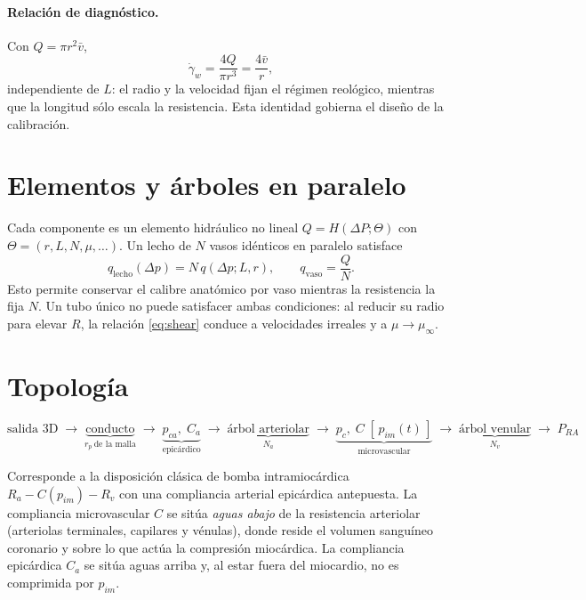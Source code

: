 \documentclass[11pt]{article}
\begin{document}
\paragraph{Relaci\'on de diagn\'ostico.} Con $Q=\pi r^2\bar v$,
\begin{equation}
  \dot\gamma_w=\frac{4Q}{\pi r^3}=\frac{4\bar v}{r},
  \label{eq:shear}
\end{equation}
independiente de $L$: el radio y la velocidad fijan el r\'egimen reol\'ogico,
mientras que la longitud s\'olo escala la resistencia. Esta identidad gobierna
el dise\~no de la calibraci\'on.

\section{Elementos y \'arboles en paralelo}

Cada componente es un elemento hidr\'aulico no lineal $Q=H(\Delta P;\Theta)$ con
$\Theta=(r,L,N,\mu,\dots)$. Un lecho de $N$ vasos id\'enticos en paralelo
satisface
\begin{equation}
  q_{\text{lecho}}(\Delta p)=N\,q(\Delta p;L,r),
  \qquad
  q_{\text{vaso}}=\frac{Q}{N} .
  \label{eq:paralelo}
\end{equation}
Esto permite conservar el calibre anat\'omico por vaso mientras la resistencia
la fija $N$. Un tubo \'unico no puede satisfacer ambas condiciones: al reducir
su radio para elevar $R$, la relaci\'on \eqref{eq:shear} conduce a velocidades
irreales y a $\mu\to\mu_\infty$.

\section{Topolog\'ia}
\label{sec:topo}

\[
\text{salida 3D}\;\rightarrow\;
\underbrace{\text{conducto}}_{r_p\ \text{de la malla}}\;\rightarrow\;
\underbrace{p_{ca},\;C_a}_{\text{epic\'ardico}}\;\rightarrow\;
\underbrace{\text{\'arbol arteriolar}}_{N_a}\;\rightarrow\;
\underbrace{p_c,\;C\;[\,p_{im}(t)\,]}_{\text{microvascular}}\;\rightarrow\;
\underbrace{\text{\'arbol venular}}_{N_v}\;\rightarrow\; P_{RA}
\]

\noindent
Corresponde a la disposici\'on cl\'asica de bomba intramioc\'ardica
$R_a-C(p_{im})-R_v$ con una compliancia arterial epic\'ardica antepuesta. La
compliancia microvascular $C$ se sit\'ua \emph{aguas abajo} de la resistencia
arteriolar (arteriolas terminales, capilares y v\'enulas), donde reside el
volumen sangu\'ineo coronario y sobre lo que act\'ua la compresi\'on
mioc\'ardica. La compliancia epic\'ardica $C_a$ se sit\'ua aguas arriba y, al
estar fuera del miocardio, no es comprimida por $p_{im}$.
\end{document}

